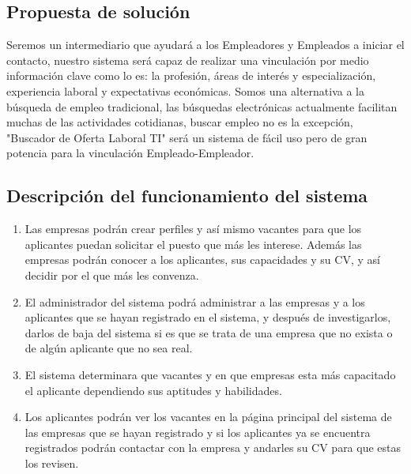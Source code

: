 \subsection{Propuesta de solución}
Seremos un intermediario que ayudará  a los Empleadores y Empleados a iniciar el contacto, nuestro sistema será capaz de realizar una vinculación por medio información clave como lo es: la profesión, áreas de interés y especialización, experiencia laboral y expectativas económicas.
Somos una alternativa a la búsqueda de empleo tradicional, las búsquedas electrónicas actualmente facilitan muchas de  las actividades cotidianas, buscar empleo no es la excepción,  "Buscador de Oferta Laboral TI"  será un sistema de  fácil uso pero de gran potencia para la vinculación Empleado-Empleador. 

\subsection{Descripción del funcionamiento del sistema}

\begin{enumerate}
	\item Las empresas podrán crear perfiles y así mismo vacantes para que los aplicantes puedan solicitar el puesto que más les interese. Además las empresas podrán conocer a los aplicantes, sus capacidades y su CV, y así decidir por el que más les convenza. 
	\item El administrador del sistema podrá administrar a las empresas y a los aplicantes que se hayan registrado en el sistema, y después de investigarlos, darlos de baja del sistema si es que se trata de una empresa que no exista o de algún aplicante que no sea real.
	\item El sistema determinara que vacantes y en que empresas esta más capacitado el aplicante dependiendo sus aptitudes y habilidades.
	\item Los aplicantes podrán ver los vacantes en la página principal del sistema de las empresas que se hayan registrado y si los aplicantes ya se encuentra registrados podrán contactar con la empresa y andarles su CV para que estas los revisen. 


\end{enumerate}







